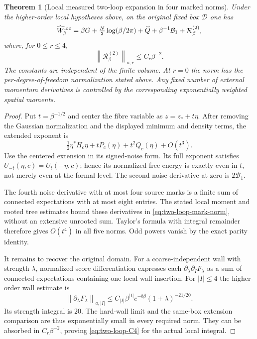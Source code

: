 \documentclass[11pt,oneside,openany]{book}
\newtheorem{theorem}{Theorem}[chapter]
\theoremstyle{definition}
\theoremstyle{remark}
\newcommand{\norm}[1]{\left\lVert#1\right\rVert}
\begin{document}
\begin{theorem}[Local measured two-loop expansion in four marked norms]
\label{thm:measured-two-loop}
Under the higher-order local hypotheses above, on the original fixed
box $\mathcal D$ one has
\begin{equation}
 \widehat W_\beta^{\rm loc}
 =\beta G+\tfrac N2\log(\beta/2\pi)+\widehat Q
                         +\beta^{-1}\mathcal B_1+\mathcal R_\beta^{(2)},
 \label{eq:two-loop-expansion}
\end{equation}
where, for $0\le r\le4$,
\begin{equation}
 \norm{\mathcal R_\beta^{(2)}}_{a,r}\le C_r\beta^{-2}.
 \label{eq:two-loop-C4}
\end{equation}
The constants are independent of the finite volume. At $r=0$ the norm
has the per-degree-of-freedom normalization stated above. Any fixed
number of external momentum derivatives is controlled by the
corresponding exponentially weighted spatial moments.
\end{theorem}
\begin{proof}
Put $t=\beta^{-1/2}$ and center the fibre variable as $z=z_*+t\eta$.
After removing the Gaussian normalization and the displayed minimum
and density terms, the extended exponent is
\[
 \tfrac12\eta^*H_c\eta+tP_c(\eta)+t^2Q_c(\eta)+O(t^3).
\]
Use the centered extension in its signed-noise form. Its full exponent
satisfies $U_{-t}(\eta,c)=U_t(-\eta,c)$; hence its normalized free
energy is exactly even in $t$, not merely even at the formal level.
The second noise derivative at zero is $2\mathcal B_1$.

The fourth noise derivative with at most four source marks is a finite
sum of connected expectations with at most eight entries. The stated
local moment and rooted tree estimates bound these derivatives in
\cref{eq:two-loop-mark-norm}, without an extensive unrooted sum. Taylor's
formula with integral remainder therefore gives $O(t^4)$ in all five
norms. Odd powers vanish by the exact parity identity.

It remains to recover the original domain. For a coarse-independent
wall with strength $\lambda$, normalized score differentiation expresses
each $\partial_\lambda\partial_I F_\lambda$ as a sum of connected
expectations containing one local wall insertion. For $|I|\le4$ the
higher-order wall estimate is
\[
 \norm{\partial_\lambda F_\lambda}_{a,|I|}
 \le C_{|I|}\beta^{|I|}e^{-b\beta}
                                    (1+\lambda)^{-21/20}.
\]
Its strength integral is $20$. The hard-wall limit and the same-box
extension comparison are thus exponentially small in every required
norm. They can be absorbed in $C_r\beta^{-2}$, proving
\cref{eq:two-loop-C4} for the actual local integral.
\end{proof}
\end{document}
